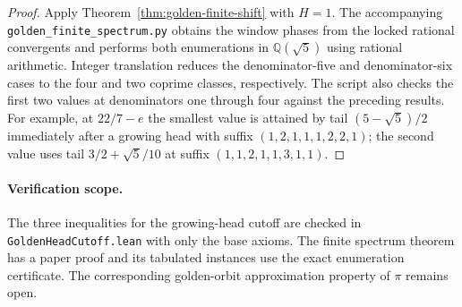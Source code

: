\documentclass[11pt]{amsart}
\theoremstyle{definition}
\theoremstyle{remark}
\numberwithin{equation}{section}
\newcommand{\Q}{\mathbb{Q}}
\begin{document}
\begin{proof}
Apply Theorem~\ref{thm:golden-finite-shift} with $H=1$. The accompanying
\texttt{golden\_finite\_spectrum.py} obtains the window phases from the
locked rational convergents and performs both enumerations in
$\Q(\sqrt5)$ using rational arithmetic. Integer translation reduces
the denominator-five and denominator-six cases to the four and two
coprime classes, respectively. The script also checks the first two
values at denominators one through four against the preceding results.
For example, at $22/7-e$ the smallest value is attained by tail
$(5-\sqrt5)/2$ immediately after a growing head with suffix
$(1,2,1,1,1,2,2,1)$; the second value uses tail
$3/2+\sqrt5/10$ at suffix $(1,1,2,1,1,3,1,1)$.
\end{proof}

\paragraph{Verification scope.}
The three inequalities for the growing-head cutoff are checked in
\texttt{GoldenHeadCutoff.lean} with only the base axioms. The finite
spectrum theorem has a paper proof and its tabulated instances use the
exact enumeration certificate. The corresponding golden-orbit
approximation property of $\pi$ remains open.
\end{document}

